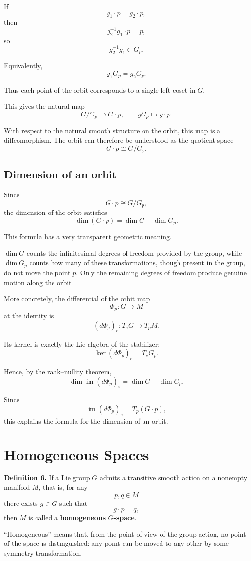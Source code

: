 \documentclass[11pt]{article}
\begin{document}
If
\[
g_1\cdot p=g_2\cdot p,
\]
then
\[
g_2^{-1}g_1\cdot p=p,
\]
so
\[
g_2^{-1}g_1\in G_p.
\]

Equivalently,
\[
g_1G_p=g_2G_p.
\]

Thus each point of the orbit corresponds to a single left coset in $G$.

This gives the natural map
\[
G/G_p\longrightarrow G\cdot p,
\qquad
gG_p\longmapsto g\cdot p.
\]

With respect to the natural smooth structure on the orbit, this map is a diffeomorphism. The orbit can therefore be understood as the quotient space
\[
G\cdot p\cong G/G_p.
\]


\subsection{Dimension of an orbit}

Since
\[
G\cdot p\cong G/G_p,
\]
the dimension of the orbit satisfies
\[
\boxed{
\dim(G\cdot p)
=
\dim G-\dim G_p
}.
\]

This formula has a very transparent geometric meaning.

$\dim G$ counts the infinitesimal degrees of freedom provided by the group, while $\dim G_p$ counts how many of these transformations, though present in the group, do not move the point $p$. Only the remaining degrees of freedom produce genuine motion along the orbit.

More concretely, the differential of the orbit map
\[
\Phi_p:G\to M
\]
at the identity is
\[
(d\Phi_p)_e:T_eG\to T_pM.
\]

Its kernel is exactly the Lie algebra of the stabilizer:
\[
\ker(d\Phi_p)_e
=
T_eG_p.
\]

Hence, by the rank--nullity theorem,
\[
\dim\operatorname{im}(d\Phi_p)_e
=
\dim G-\dim G_p.
\]

Since
\[
\operatorname{im}(d\Phi_p)_e
=
T_p(G\cdot p),
\]
this explains the formula for the dimension of an orbit.


\section{Homogeneous Spaces}

\textbf{Definition 6.}
If a Lie group $G$ admits a transitive smooth action on a nonempty manifold $M$, that is, for any
\[
p,q\in M
\]
there exists $g\in G$ such that
\[
g\cdot p=q,
\]
then $M$ is called a \textbf{homogeneous $G$-space}.

``Homogeneous'' means that, from the point of view of the group action, no point of the space is distinguished: any point can be moved to any other by some symmetry transformation.
\end{document}
